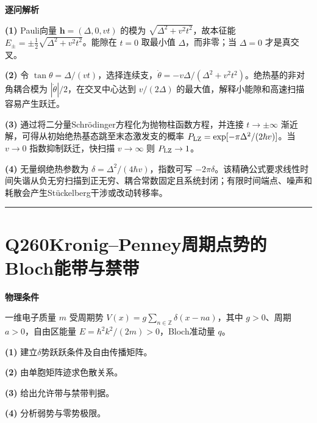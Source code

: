 \documentclass[UTF8,a4paper,11pt,oneside,openany]{ctexbook}
\begin{document}
\par\medskip\noindent\textbf{逐问解析}
\par\noindent\textbf{(1)} Pauli向量 \(\boldsymbol h=(\Delta,0,vt)\) 的模为 \(\sqrt{\Delta^2+v^2t^2}\)，故本征能 \(E_\pm=\pm\frac12\sqrt{\Delta^2+v^2t^2}\)。能隙在 \(t=0\) 取最小值 \(\Delta\)，而非零；当 \(\Delta=0\) 才是真交叉。
\par\noindent\textbf{(2)} 令 \(\tan\theta=\Delta/(vt)\)，选择连续支，\(\dot\theta=-v\Delta/(\Delta^2+v^2t^2)\)。绝热基的非对角耦合模为 \(|\dot\theta|/2\)，在交叉中心达到 \(v/(2\Delta)\) 的最大值，解释小能隙和高速扫描容易产生跃迁。
\par\noindent\textbf{(3)} 通过将二分量Schrödinger方程化为抛物柱函数方程，并连接 \(t\to\pm\infty\) 渐近解，可得从初始绝热基态跳至末态激发支的概率 \(P_{\rm LZ}=\exp[-\pi\Delta^2/(2\hbar v)]\)。当 \(v\to0\) 指数抑制跃迁，快扫描 \(v\to\infty\) 则 \(P_{\rm LZ}\to1\)。
\par\noindent\textbf{(4)} 无量纲绝热参数为 \(\delta=\Delta^2/(4\hbar v)\)，指数可写 \(-2\pi\delta\)。该精确公式要求线性时间失谐从负无穷扫描到正无穷、耦合常数固定且系统封闭；有限时间端点、噪声和耗散会产生Stückelberg干涉或改动转移率。

\par\bigskip\hrule\bigskip
\section*{Q260\quad Kronig–Penney周期点势的Bloch能带与禁带}
\textbf{物理条件}\par 一维电子质量 \(m\) 受周期势 \(V(x)=g\sum_{n\in\mathbb Z}\delta(x-na)\)，其中 \(g>0\)、周期 \(a>0\)，自由区能量 \(E=\hbar^2k^2/(2m)>0\)，Bloch准动量 \(q\)。
\par\noindent\textbf{(1)} 建立\(\delta\)势跃跃条件及自由传播矩阵。
\par\noindent\textbf{(2)} 由单胞矩阵迹求色散关系。
\par\noindent\textbf{(3)} 给出允许带与禁带判据。
\par\noindent\textbf{(4)} 分析弱势与零势极限。
\end{document}
